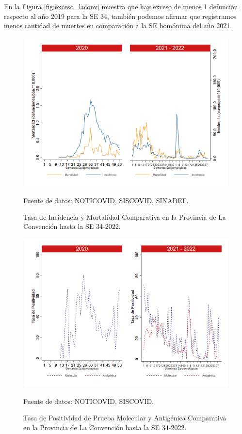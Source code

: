 \documentclass[12pt,a4paper,openany]{book}
\begin{document}
	En la Figura \ref{fig:exceso_laconv} muestra que hay exceso de menos 1 defunción respecto al año 2019 para la SE 34, también podemos afirmar que registramos menos cantidad de muertes en comparación a la SE homónima del año 2021.    
	
	\begin{figure}[h]
		\caption{Tasa de Incidencia y Mortalidad Comparativa en la Provincia de La Convención hasta la SE 34-2022.}\label{fig:inc_mort_laconv}
		\begin{center}
			\includegraphics[width=0.85\linewidth]{../figuras/incidencia_mortalidad_20_21_9.png}
		\end{center}
		{\footnotesize {Fuente de datos: NOTICOVID, SISCOVID, SINADEF.}}
	\end{figure}
	
	\begin{figure}[h]
		\caption{Tasa de Positividad de Prueba Molecular y Antigénica Comparativa en la Provincia de La Convención hasta la SE 34-2022.}\label{fig:positividad_laconv}
		\begin{center}
			\includegraphics[width=0.7\linewidth]{../figuras/positividad_20_21_9.png}
		\end{center}
		{\footnotesize {Fuente de datos: NOTICOVID, SISCOVID.}}
	\end{figure}
	
\end{document}
